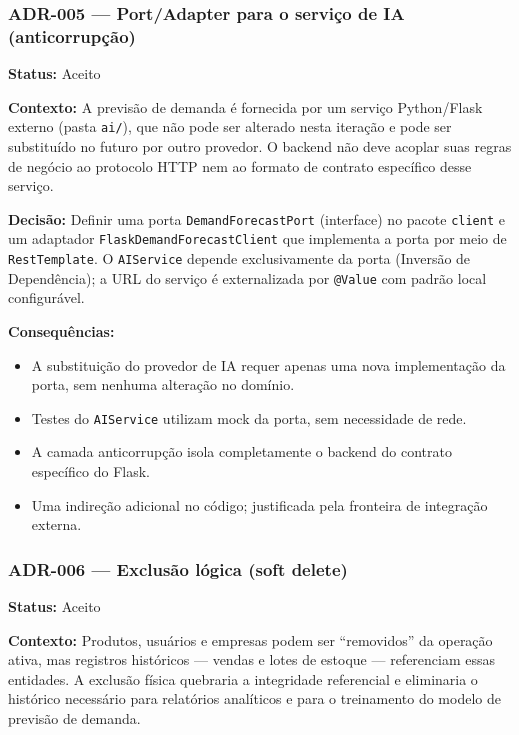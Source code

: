 \documentclass[12pt,a4paper]{article}
\begin{document}
\subsubsection{ADR-005 --- Port/Adapter para o serviço de IA (anticorrupção)}

\noindent\textbf{Status:} Aceito

\noindent\textbf{Contexto:}
A previsão de demanda é fornecida por um serviço Python/Flask externo (pasta \texttt{ai/}), que não pode ser alterado nesta iteração e pode ser substituído no futuro por outro provedor. O backend não deve acoplar suas regras de negócio ao protocolo HTTP nem ao formato de contrato específico desse serviço.

\noindent\textbf{Decisão:}
Definir uma porta \texttt{DemandForecastPort} (interface) no pacote \texttt{client} e um adaptador \texttt{FlaskDemandForecastClient} que implementa a porta por meio de \texttt{RestTemplate}. O \texttt{AIService} depende exclusivamente da porta (Inversão de Dependência); a URL do serviço é externalizada por \texttt{@Value} com padrão local configurável.

\noindent\textbf{Consequências:}
\begin{itemize}
    \item[+] A substituição do provedor de IA requer apenas uma nova implementação da porta, sem nenhuma alteração no domínio.
    \item[+] Testes do \texttt{AIService} utilizam mock da porta, sem necessidade de rede.
    \item[+] A camada anticorrupção isola completamente o backend do contrato específico do Flask.
    \item[--] Uma indireção adicional no código; justificada pela fronteira de integração externa.
\end{itemize}

\subsubsection{ADR-006 --- Exclusão lógica (soft delete)}

\noindent\textbf{Status:} Aceito

\noindent\textbf{Contexto:}
Produtos, usuários e empresas podem ser ``removidos'' da operação ativa, mas registros históricos — vendas e lotes de estoque — referenciam essas entidades. A exclusão física quebraria a integridade referencial e eliminaria o histórico necessário para relatórios analíticos e para o treinamento do modelo de previsão de demanda.
\end{document}
